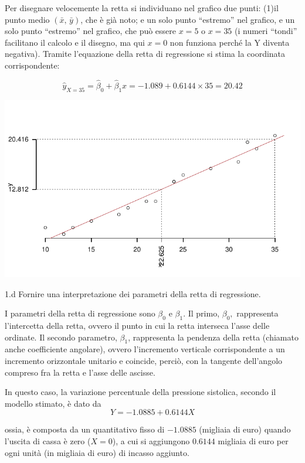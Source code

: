 \documentclass[
  11pt,
]{book}
\theoremstyle{mytheoremstyle}
\theoremstyle{mydefstyle}
\newenvironment{sol}
  {
  \begin{tcolorbox}[enhanced,breakable,arc=0.1mm,boxrule=1pt,colback=white,colframe=iblue,
  title=\bf \fontfamily{lmss}\selectfont \hspace{.5 cm} Soluzione,drop fuzzy shadow]

}{
\end{tcolorbox}
  }
\begin{document}
\begin{sol}

Per disegnare velocemente la retta si individuano nel grafico
due punti: (1)il punto medio \((\bar{x},\, \bar{y})\), che è già
noto; e un solo punto ``estremo'' nel grafico, e un solo punto ``estremo'' nel grafico, che può essere \(x=5\) o
\(x=35\) (i numeri ``tondi'' facilitano il calcolo e il disegno, ma
qui \(x=0\) non funziona perché la Y diventa negativa). Tramite
l'equazione della retta di regressione si stima la coordinata
corrispondente:

\[\hat y_{X= 35 }=\hat\beta_0+\hat\beta_1 x= -1.089 + 0.6144 \times 35 = 20.42 \]

\begin{center}\includegraphics{Esami_passati_con_soluzioni_files/figure-latex/06-regr-55-1} \end{center}

\end{sol}

1.d Fornire una interpretazione dei parametri della retta di regressione.

\begin{sol}
I parametri della retta di regressione sono \(\beta_{0}\) e \(\beta_{1}\).
Il primo, \(\beta_{0},\) rappresenta l'intercetta della retta,
ovvero il punto in cui la retta interseca l'asse delle ordinate.
Il secondo parametro, \(\beta_{1}\), rappresenta la pendenza della
retta (chiamato anche coefficiente angolare), ovvero l'incremento
verticale corrispondente a un incremento orizzontale unitario e
coincide, perciò, con la tangente dell'angolo compreso fra la
retta e l'asse delle ascisse.

In questo caso, la variazione percentuale della pressione sistolica,
secondo il modello stimato, è dato da
\[Y= -1.0885 + 0.6144 X\]

ossia, è composta da un quantitativo fisso di \(-1.0885\) (migliaia
di euro) quando l'uscita di cassa è zero (\(X=0\)), a cui si
aggiungono \(0.6144\) migliaia di euro per ogni unità (in migliaia di
euro) di incasso aggiunto.

\end{sol}
\end{document}
